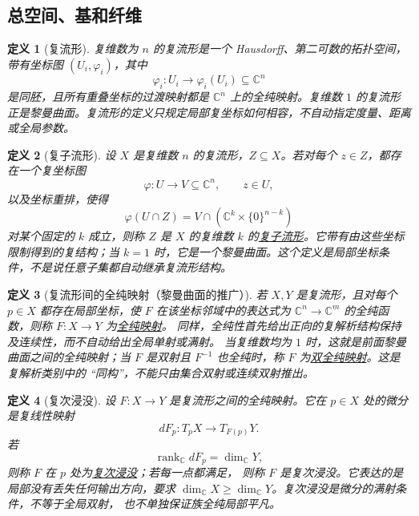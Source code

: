 \documentclass[UTF8,fontset=none,a4paper,11pt]{ctexart}
\theoremstyle{foundation-definition}
\newtheorem{definition}{定义}[section]
\theoremstyle{foundation-theorem}
\theoremstyle{foundation-proposition}
\theoremstyle{foundation-example}
\theoremstyle{foundation-remark}
\theoremstyle{foundation-theorem}
\newcommand{\C}{\mathbb C}
\newcommand{\term}[2]{\hyperref[#1]{#2}}
\begin{document}
\subsection{总空间、基和纤维}

\begin{definition}[复流形]\label{def:complex-manifold}
复维数为 \(n\) 的复流形是一个 Hausdorff、第二可数的拓扑空间，带有坐标图
\((U_i,\varphi_i)\)，其中
\[
\varphi_i:U_i\longrightarrow\varphi_i(U_i)\subseteq\C^n
\]
是同胚，且所有重叠坐标的过渡映射都是 \(\C^n\) 上的全纯映射。复维数 \(1\) 的复流形
正是黎曼曲面。复流形的定义只规定局部复坐标如何相容，不自动指定度量、距离或全局参数。
\end{definition}

\begin{definition}[复子流形]\label{def:complex-submanifold}
设 \(X\) 是复维数 \(n\) 的复流形，\(Z\subseteq X\)。若对每个 \(z\in Z\)，都存在一个复坐标图
\[
 \varphi:U\longrightarrow V\subseteq\C^n,
 \qquad z\in U,
\]
以及坐标重排，使得
\[
 \varphi(U\cap Z)=V\cap(\C^k\times\{0\}^{n-k})
\]
对某个固定的 \(k\) 成立，则称 \(Z\) 是 \(X\) 的复维数 \(k\) 的\term{def:complex-submanifold}{复子流形}。它带有由这些坐标限制得到的复结构；当 \(k=1\) 时，它是一个黎曼曲面。这个定义是局部坐标条件，不是说任意子集都自动继承复流形结构。
\end{definition}

\begin{definition}[复流形间的全纯映射（黎曼曲面的推广）]\label{def:complex-holomorphic-map}
若 \(X,Y\) 是复流形，且对每个 \(p\in X\) 都存在局部坐标，使 \(F\) 在该坐标邻域中的表达式为
\(\C^n\to\C^m\) 的全纯函数，则称 \(F:X\to Y\) 为\term{def:complex-holomorphic-map}{全纯映射}。
同样，全纯性首先给出正向的复解析结构保持及连续性，而不自动给出全局单射或满射。
当复维数均为 \(1\) 时，这就是前面黎曼曲面之间的全纯映射；当 \(F\) 是双射且
\(F^{-1}\) 也全纯时，称 \(F\) 为\term{def:biholomorphic}{双全纯映射}。这是复解析类别中的
“同构”，不能只由集合双射或连续双射推出。
\end{definition}

\begin{definition}[复次浸没]\label{def:complex-submersion}
设 \(F:X\to Y\) 是复流形之间的全纯映射。它在 \(p\in X\) 处的微分是复线性映射
\[
dF_p:T_pX\longrightarrow T_{F(p)}Y.
\]
若
\[
\operatorname{rank}_{\mathbb C}dF_p=\dim_{\mathbb C}Y,
\]
则称 \(F\) 在 \(p\) 处为\term{def:complex-submersion}{复次浸没}；若每一点都满足，
则称 \(F\) 是复次浸没。它表达的是局部没有丢失任何输出方向，要求
\(\dim_{\mathbb C}X\geq\dim_{\mathbb C}Y\)。复次浸没是微分的满射条件，不等于全局双射，
也不单独保证族全纯局部平凡。
\end{definition}
\end{document}

